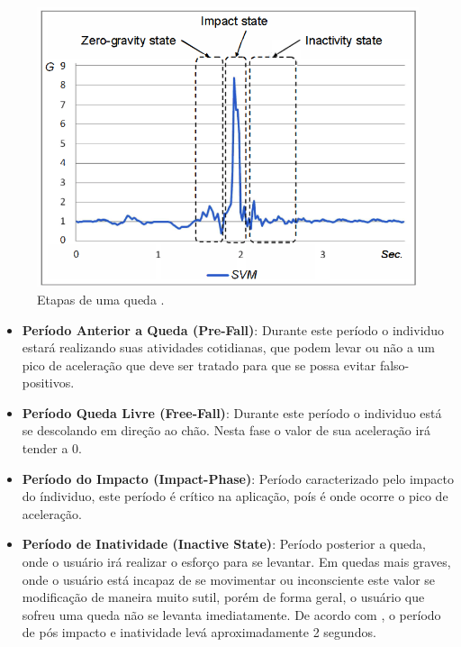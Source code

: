 \begin{figure}[ht]
	\centering
	\includegraphics[width=.8\textwidth]{imagens/fall_states.png}
	\caption{Etapas de uma queda \citep{hsieh2014wrist}.}
	\label{fig:fall_states}
\end{figure} 


\begin{itemize}

	
	\item{\textbf{Período Anterior a Queda (Pre-Fall)}: Durante este período o individuo estará realizando suas atividades cotidianas, que podem levar ou não a um pico de aceleração que deve ser tratado para que se possa evitar falso-positivos. }
	
	\item{\textbf{Período Queda Livre (Free-Fall)}: Durante este período o individuo está se descolando em direção ao chão. Nesta fase o valor de sua aceleração irá tender a 0.  }
	
	\item{\textbf{Período do Impacto (Impact-Phase)}: Período caracterizado pelo impacto do índividuo, este período é crítico na aplicação, poís é onde ocorre o pico de aceleração. }
	
	\item{\textbf{Período de Inatividade (Inactive State)}: Período posterior a queda, onde o usuário irá realizar o esforço para se levantar. Em quedas mais graves, onde o usuário está incapaz de se movimentar ou inconsciente este valor se modificação de maneira muito sutil, porém de forma geral, o usuário que sofreu uma queda não se levanta imediatamente. De acordo com \cite{mehner2013location}, o período de pós impacto e inatividade levá aproximadamente 2 segundos.  }
	
\end{itemize}


